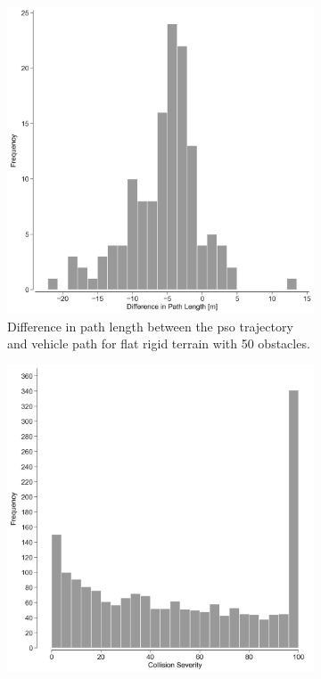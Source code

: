 \begin{figure}
    \captionsetup{justification=centering}
    \centering
    \begin{subfigure}{0.45\textwidth}
        \includegraphics[height=.22\paperheight]{images/demonstration/rigid_9_pso_metric_histogram.png}
        \caption{Difference in path length between the pso trajectory and vehicle path for flat rigid terrain with 50 obstacles.}
        \label{fig:pso_length_compare}
    \end{subfigure}%
    \hfill
    \begin{subfigure}{0.45\textwidth}
        \includegraphics[height=.22\paperheight]{images/demonstration/rigid_failure_metric_histogram.png}

\end{subfigure}
\end{figure}
